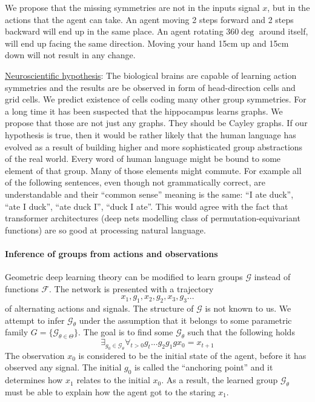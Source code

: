 \documentclass[12pt]{article}
\begin{document}
We propose that the missing symmetries are not in the inputs signal $x$, but in the actions that the agent can take. An agent moving 2 steps forward and 2 steps backward will end up in the same place. An agent rotating $360\deg$ around itself, will end up facing the same direction. Moving your hand 15cm up and 15cm down will not result in any change. 

\underline{Neuroscientific hypothesis}: The biological brains are capable of learning action symmetries and the results are be observed in form of head-direction cells and grid cells. We predict existence of cells coding many other group symmetries. For a long time it has been suspected that the hippocampus learns graphs. We propose that those are not just any graphs. They should be Cayley graphs. If our hypothesis is true, then it would be rather likely that the human language has evolved as a result of building higher and more sophisticated group abstractions of the real world. Every word of human language might be bound to some element of that group. Many of those elements might commute. For example all of the following sentences, even though not grammatically correct, are understandable and their ``common sense'' meaning is the same: ``I ate duck'', ``ate I  duck'', ``ate duck I'', ``duck I ate''. This would agree with the fact that transformer architectures (deep nets modelling class of permutation-equivariant functions) are so good at processing natural language. 

\paragraph{Inference of groups from actions and observations}

Geometric deep learning theory can be modified to learn groups $\mathcal{G}$ instead of functions $\mathcal{F}$. The network is presented with a trajectory \[x_1,g_1,x_2,g_2,x_3,g_3...\] 
of alternating actions and signals. The structure of $\mathcal{G}$ is not known to us. We attempt to infer  $\mathcal{G}_\theta$ under the assumption that  it belongs to some parametric family $G=\{\mathcal{G}_{\theta\in\Theta}\}$. The goal is to find some $\mathcal{G}_\theta$ such that the following holds 
\[
\exists_{ g_0\in\mathcal{G}_\theta} \forall_{t>0} g_t...g_2g_1gx_0 = x_{t+1}
\] The observation $x_0$ is considered to be the initial state of the agent, before it has observed any signal. The initial $g_0$ is called the ``anchoring point'' and it determines how $x_1$ relates to the initial $x_0$. As a result, the learned group $\mathcal{G}_\theta$ must be able to explain how the agent got to the staring $x_1$. 
\end{document}
